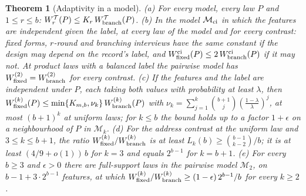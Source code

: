 \documentclass{article}
\newtheorem{theorem}{Theorem}
\begin{document}
\begin{theorem}[Adaptivity in a model]\label{thm:structured}
\textup{(a)} For every model, every law $P$ and $1\le r\le b$: $W^{\mathcal T}_r(P)\le K_r\,W^{\mathcal T}_{\rm branch}(P)$.
\textup{(b)} In the model $\mathcal M_{\rm ci}$ in which the features are independent given the label, at every law of the model and for every contrast: fixed forms, $r$-round and branching interviews have the same constant if the design may depend on the record's label, and $W^{\rm ci}_{\rm fixed}(P)\le2\,W^{\rm ci}_{\rm branch}(P)$ if it may not. At product laws with a balanced label the pairwise model has $W^{(2)}_{\rm fixed}=W^{(2)}_{\rm branch}$ for every contrast.
\textup{(c)} If the features and the label are independent under $P$, each taking both values with probability at least $\lambda$, then $W^{(k)}_{\rm fixed}(P)\le\min\{K_{m,b},\nu_k\}\,W^{(k)}_{\rm branch}(P)$ with $\nu_k=\sum_{j=1}^k\binom{b+1}j(\frac{1-\lambda}\lambda)^j$, at most $(b+1)^k$ at uniform laws; for $k\le b$ the bound holds up to a factor $1+\epsilon$ on a neighbourhood of $P$ in $\mathcal M_k$.
\textup{(d)} For the address contrast at the uniform law and $3\le k\le b+1$, the ratio $W^{(k)}_{\rm fixed}/W^{(k)}_{\rm branch}$ is at least $L_k(b)\ge\binom{b-1}{k-2}/b$; it is at least $(4/9+o(1))\,b$ for $k=3$ and equals $2^{b-1}$ for $k=b+1$.
\textup{(e)} For every $b\ge3$ and $\epsilon>0$ there are full-support laws in the pairwise model $\mathcal M_2$, on $b-1+3\cdot2^{b-1}$ features, at which $W^{(k)}_{\rm fixed}/W^{(k)}_{\rm branch}\ge(1-\epsilon)\,2^{b-1}/b$ for every $k\ge2$.
\end{theorem}
\end{document}

